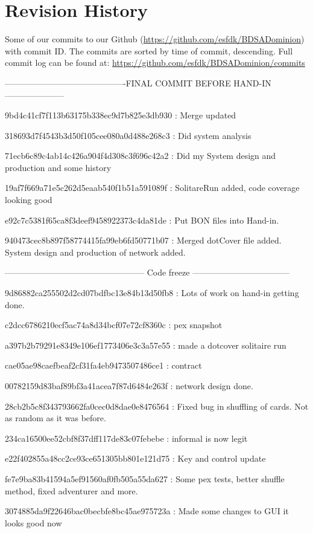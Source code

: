 \section{Revision History}
Some of our commits to our Github (\url{https://github.com/esfdk/BDSADominion})  with commit ID. The commits are sorted by time of commit, descending. Full commit log can be found at: \url{https://github.com/esfdk/BDSADominion/commits}

-------------------------------------------FINAL COMMIT BEFORE HAND-IN---------------------

9bd4c41cf7f113b63175b338ec9d7b825e3db930 : Merge updated

318693d7f4543b3d50f105cee080a0d488e268c3 : Did system analysis

71ecb6c89c4ab14c426a904f4d308c3f696c42a2 : Did my System design and production and some history

19af7f669a71e5c262d5eaab540f1b51a591089f : SolitareRun added, code coverage looking good

e92c7c5381f65ca8f3deef9458922373c4da81de : Put BON files into Hand-in.

940473cec8b897f58774415fa99eb6fd50771b07 : Merged dotCover file added. System design and production of network added.

-------------------------------------------------- Code freeze -----------------------------------

9d86882ca255502d2cd07bdfbc13e84b13d50fb8 : Lots of work on hand-in getting done.

c2dcc6786210ecf5ac74a8d34bcf07e72cf8360c : pex snapshot

a397b2b79291e8349e106ef1773406e3c3a57e55 : made a dotcover solitaire run

cae05ae98caefbeaf2cf31fa4eb9473507486ce1 : contract

00782159d83baf89bf3a41acea7f87d6484e263f : network design done.

28cb2b5c8f343793662fa0cec0d8dae0e8476564 : Fixed bug in shuffling of cards. Not as random as it was before.

234ca16500ee52cbf8f37dff117de83c07febebe : informal is now legit

e22f402855a48cc2ce93ce651305bb801e121d75 : Key and control update

fe7e9ba83b41594a5ef91560af0fb505a55da627 : Some pex tests, better shuffle method, fixed adventurer and more.

3074885da9f22646bac0becbfe8bc45ae975723a : Made some changes to GUI it looks good now

